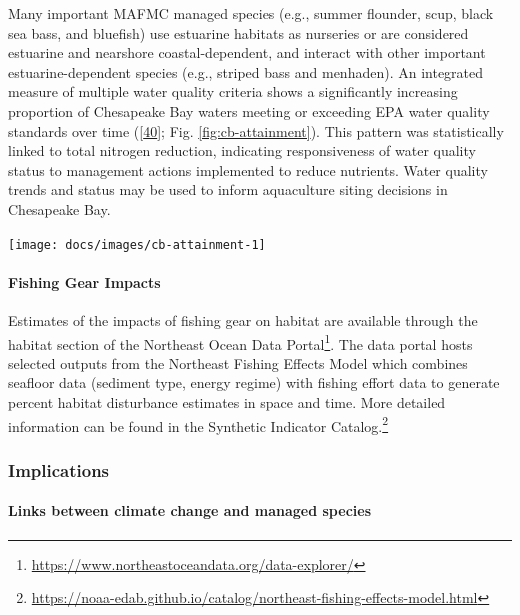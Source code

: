 \documentclass[
  10pt,
]{article}
\let\origfigure\figure
\let\endorigfigure\endfigure
\renewenvironment{figure}[1][2] {
    \expandafter\origfigure\expandafter[H]
} {
    \endorigfigure
}
\begin{document}
Many important MAFMC managed species (e.g., summer flounder, scup, black
sea bass, and bluefish) use estuarine habitats as nurseries or are
considered estuarine and nearshore coastal-dependent, and interact with
other important estuarine-dependent species (e.g., striped bass and
menhaden). An integrated measure of multiple water quality criteria
shows a significantly increasing proportion of Chesapeake Bay waters
meeting or exceeding EPA water quality standards over time
({[}\protect\hyperlink{ref-zhang_chesapeake_2018}{40}{]}; Fig.
\ref{fig:cb-attainment}). This pattern was statistically linked to total
nitrogen reduction, indicating responsiveness of water quality status to
management actions implemented to reduce nutrients. Water quality trends
and status may be used to inform aquaculture siting decisions in
Chesapeake Bay.

\begin{figure}

{\centering \texttt{[image: docs/images/cb-attainment-1]} 

}

\caption{Water quality attainment in Chesapeake Bay following rolling three year assessment periods.}\label{fig:cb-attainment}
\end{figure}

\hypertarget{fishing-gear-impacts}{%
\paragraph{Fishing Gear Impacts}\label{fishing-gear-impacts}}

Estimates of the impacts of fishing gear on habitat are available
through the habitat section of the Northeast Ocean Data
Portal\footnote{\url{https://www.northeastoceandata.org/data-explorer/}}.
The data portal hosts selected outputs from the Northeast Fishing
Effects Model which combines seafloor data (sediment type, energy
regime) with fishing effort data to generate percent habitat disturbance
estimates in space and time. More detailed information can be found in
the Synthetic Indicator Catalog.\footnote{\url{https://noaa-edab.github.io/catalog/northeast-fishing-effects-model.html}}

\hypertarget{implications-6}{%
\subsubsection{Implications}\label{implications-6}}

\hypertarget{links-between-climate-change-and-managed-species}{%
\paragraph{Links between climate change and managed
species}\label{links-between-climate-change-and-managed-species}}
\end{document}
